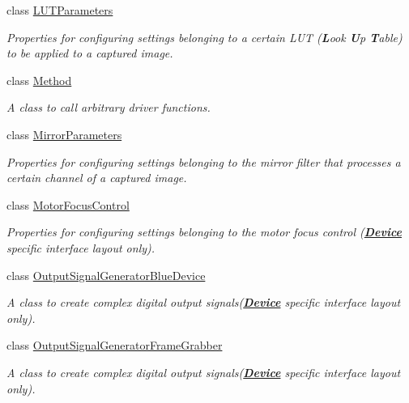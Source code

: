 \begin{DoxyCompactItemize}
class \hyperlink{classmv_i_m_p_a_c_t_1_1acquire_1_1_l_u_t_parameters}{L\+U\+T\+Parameters}
\begin{DoxyCompactList}\small\item\em Properties for configuring settings belonging to a certain L\+U\+T ({\bfseries L}ook {\bfseries U}p {\bfseries T}able) to be applied to a captured image. \end{DoxyCompactList}\item 
class \hyperlink{classmv_i_m_p_a_c_t_1_1acquire_1_1_method}{Method}
\begin{DoxyCompactList}\small\item\em A class to call arbitrary driver functions. \end{DoxyCompactList}\item 
class \hyperlink{classmv_i_m_p_a_c_t_1_1acquire_1_1_mirror_parameters}{Mirror\+Parameters}
\begin{DoxyCompactList}\small\item\em Properties for configuring settings belonging to the mirror filter that processes a certain channel of a captured image. \end{DoxyCompactList}\item 
class \hyperlink{classmv_i_m_p_a_c_t_1_1acquire_1_1_motor_focus_control}{Motor\+Focus\+Control}
\begin{DoxyCompactList}\small\item\em Properties for configuring settings belonging to the motor focus control ({\bfseries \hyperlink{classmv_i_m_p_a_c_t_1_1acquire_1_1_device}{Device}} specific interface layout only). \end{DoxyCompactList}\item 
class \hyperlink{classmv_i_m_p_a_c_t_1_1acquire_1_1_output_signal_generator_blue_device}{Output\+Signal\+Generator\+Blue\+Device}
\begin{DoxyCompactList}\small\item\em A class to create complex digital output signals({\bfseries \hyperlink{classmv_i_m_p_a_c_t_1_1acquire_1_1_device}{Device}} specific interface layout only). \end{DoxyCompactList}\item 
class \hyperlink{classmv_i_m_p_a_c_t_1_1acquire_1_1_output_signal_generator_frame_grabber}{Output\+Signal\+Generator\+Frame\+Grabber}
\begin{DoxyCompactList}\small\item\em A class to create complex digital output signals({\bfseries \hyperlink{classmv_i_m_p_a_c_t_1_1acquire_1_1_device}{Device}} specific interface layout only). \end{DoxyCompactList}\item 

\end{DoxyCompactItemize}

